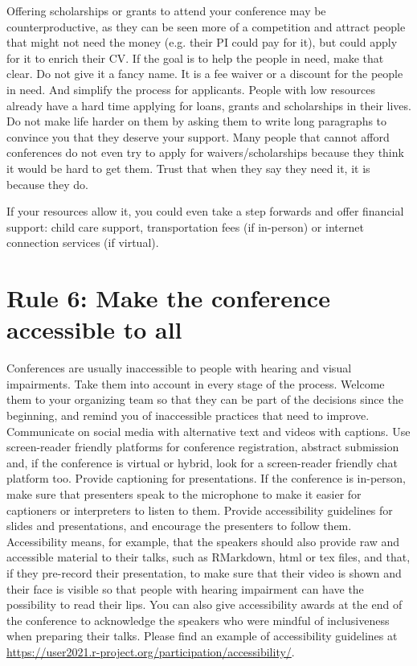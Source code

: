 \documentclass[10pt,letterpaper]{article}
\begin{document}
Offering scholarships or grants to attend your conference may be counterproductive, as they can be seen more of a competition and attract people that might not need the money (e.g. their PI could pay for it), but could apply for it to enrich their CV. If the goal is to help the people in need, make that clear. Do not give it a fancy name. It is a fee waiver or a discount for the people in need. And simplify the process for applicants. People with low resources already have a hard time applying for loans, grants and scholarships in their lives. Do not make life harder on them by asking them to write long paragraphs to convince you that they deserve your support. Many people that cannot afford conferences do not even try to apply for waivers/scholarships because they think it would be hard to get them. Trust that when they say they need it, it is because they do.  

If your resources allow it, you could even take a step forwards and offer financial support: child care support, transportation fees (if in-person) or internet connection services (if virtual). 

\section*{Rule 6: Make the conference accessible to all}

Conferences are usually inaccessible to people with hearing and visual impairments. Take them into account in every stage of the process. Welcome them to your organizing team so that they can be part of the decisions since the beginning, and remind you of inaccessible practices that need to improve. Communicate on social media with alternative text and videos with captions. Use screen-reader friendly platforms for conference registration, abstract submission and, if the conference is virtual or hybrid, look for a screen-reader friendly chat platform too. Provide captioning for presentations. If the conference is in-person, make sure that presenters speak to the microphone to make it easier for captioners or interpreters to listen to them. Provide accessibility guidelines for slides and presentations, and encourage the presenters to follow them. Accessibility means, for example, that the speakers should also provide raw and accessible material to their talks, such as RMarkdown, html or tex files, and that, if they pre-record their presentation, to make sure that their video is shown and their face is visible so that people with hearing impairment can have the possibility to read their lips. You can also give accessibility awards at the end of the conference to acknowledge the speakers who were mindful of inclusiveness when preparing their talks. Please find an example of accessibility guidelines at \url{https://user2021.r-project.org/participation/accessibility/}.
\end{document}
